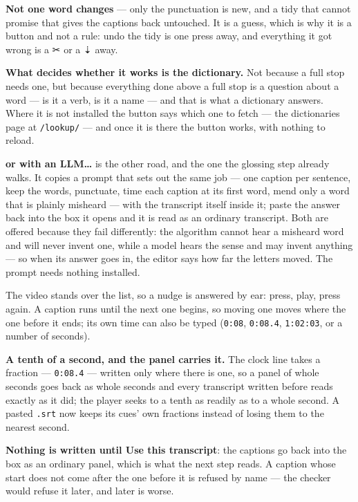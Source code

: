 \documentclass[11pt,oneside]{report}
\newcommand{\sym}[1]{{\symfont #1}}
\newcommand{\file}[1]{\texttt{#1}}
\newcommand{\menu}[1]{\textsf{#1}}
\begin{document}
\textbf{Not one word changes} --- only the punctuation is new, and a tidy
that cannot promise that gives the captions back untouched. It is a guess,
which is why it is a button and not a rule: \menu{undo the tidy} is one press
away, and everything it got wrong is a \menu{\sym{✂}} or a \menu{\sym{⇣}}
away.

\textbf{What decides whether it works is the dictionary.} Not because a full
stop needs one, but because everything done above a full stop is a question
about a word --- is it a verb, is it a name --- and that is what a dictionary
answers. Where it is not installed the button says which one to fetch --- the
dictionaries page at \texttt{/lookup/} --- and once it is there the button
works, with nothing to reload.

\textbf{\menu{or with an LLM\ldots}} is the other road, and the one the
glossing step already walks. It copies a prompt that sets out the same job ---
one caption per sentence, keep the words, punctuate, time each caption at its
first word, mend only a word that is plainly misheard --- with the transcript
itself inside it; paste the answer back into the box it opens and it is read
as an ordinary transcript. Both are offered because they fail differently:
the algorithm cannot hear a misheard word and will never invent one, while a
model hears the sense and may invent anything --- so when its answer goes in,
the editor says how far the letters moved. The prompt needs nothing installed.

The video stands over the list, so a nudge is answered by ear: press, play,
press again. A caption runs until the next one begins, so moving one moves
where the one before it ends; its own time can also be typed
(\texttt{0:08}, \texttt{0:08.4}, \texttt{1:02:03}, or a number of seconds).

\textbf{A tenth of a second, and the panel carries it.} The clock line takes
a fraction --- \texttt{0:08.4} --- written only where there is one, so a
panel of whole seconds goes back as whole seconds and every transcript
written before reads exactly as it did; the player seeks to a tenth as
readily as to a whole second. A pasted \file{.srt} now keeps its cues' own
fractions instead of losing them to the nearest second.

\textbf{Nothing is written until \menu{Use this transcript}}: the captions
go back into the box as an ordinary panel, which is what the next step reads.
A caption whose start does not come after the one before it is refused by
name --- the checker would refuse it later, and later is worse.
\end{document}
